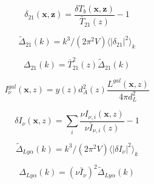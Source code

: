 
\begin{equation}
  \delta_{21}\left(\textbf{x}, \textbf{z} \right) = \frac{\delta T_{b}\left(\textbf{x}, \textbf{z} \right)}{\bar{T}_{21}(z)} - 1
\end{equation}

\begin{equation}
  \tilde{\Delta}_{21} \left( k \right) = k^3 / (2 \pi^2 V) \langle | \delta_{21} |^2 \rangle_k
\end{equation}

\begin{equation}
  \Delta_{21} \left( k \right) = \bar{T}_{21}^2(z)\tilde{\Delta}_{21} \left( k \right)
\end{equation}

\begin{equation}
  I_{\nu}^{gal}\left(\textbf{x}, z \right) = y \left(z \right)d_A^2 \left(z \right) \frac{L^{gal} \left(\textbf{x}, z \right)}{4 \pi d_L^2}
\end{equation}

\begin{equation}
  \delta I_{\nu} \left(\textbf{x}, z \right) = \sum_i \frac{\nu I_{\nu, i} \left(\textbf{x}, z \right)}{\nu \bar{I}_{\nu, i} \left(z \right)} - 1
\end{equation}

\begin{equation}
  \tilde{\Delta}_{Ly\alpha} \left( k \right) = k^3 / (2 \pi^2 V) \langle | \delta I_{\nu} |^2 \rangle_k
\end{equation}

\begin{equation}
  \Delta_{Ly\alpha} \left( k \right) = \left(\nu \bar{I}_{\nu} \right)^2\tilde{\Delta}_{Ly\alpha} \left( k \right)
\end{equation}
